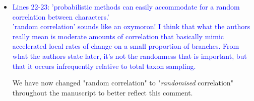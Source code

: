 \documentclass[12pt,letterpaper]{article}
\begin{document}
\begin{itemize}

\item{\textcolor{blue}{Lines 22-23: 'probabilistic methods can easily accommodate for a random correlation between characters.'
\\
'random correlation' sounds like an oxymoron! I think that what the authors really mean is moderate amounts of correlation that basically mimic accelerated local rates of change on a small proportion of branches. From what the authors state later, it's not the randomness that is important, but that it occurs infrequently relative to total taxon sampling.}}

We have now changed "random correlation" to "\textit{randomised} correlation" throughout the manuscript to better reflect this comment.


\end{itemize}
\end{document}

